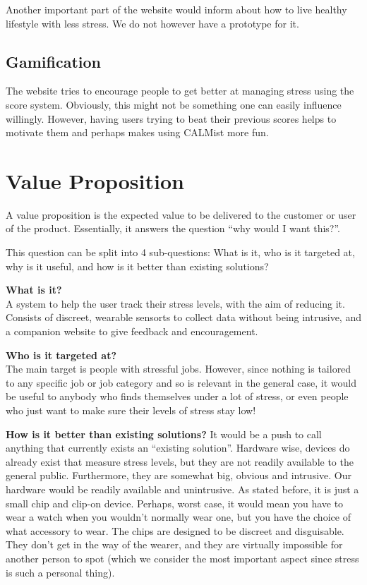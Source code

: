 \documentclass{scrartcl}
\begin{document}
Another important part of the website would inform about how to live healthy lifestyle with less stress. We do not however have a prototype for it.

\subsection{Gamification}

The website tries to encourage people to get better at managing stress using the score system. Obviously, this might not be something one can easily influence willingly. However, having users trying to beat their previous scores helps to motivate them and perhaps makes using CALMist more fun.

\section{Value Proposition}
A value proposition is the expected value to be delivered to the customer or user of the product. Essentially, it answers the
question ``why would I want this?''.

This question can be split into 4 sub-questions: What is it, who is it targeted at, why is it useful, and how is it better than
existing solutions?

\textbf{What is it?}\\
A system to help the user track their stress levels, with the aim of reducing it. Consists of discreet, wearable sensorts to collect
data without being intrusive, and a companion website to give feedback and encouragement.

\textbf{Who is it targeted at?}\\
The main target is people with stressful jobs. However, since nothing is tailored to any specific job or job category and so
is relevant in the general case, it would be useful to anybody who finds themselves under a lot of stress, or even people
who just want to make sure their levels of stress stay low!

\textbf{How is it better than existing solutions?}
It would be a push to call anything that currently exists an ``existing solution''. Hardware wise, devices do already exist that
measure stress levels, but they are not readily available to the general public. Furthermore, they are somewhat big, obvious and
intrusive. Our hardware would be readily available and unintrusive. As stated before, it is just a small chip and clip-on device.
Perhaps, worst case, it would mean you have to wear a watch when you wouldn't normally wear one, but you have the choice of what
accessory to wear. The chips are designed to be discreet and disguisable. They don't get in the way of the wearer, and they are
virtually impossible for another person to spot (which we consider the most important aspect since stress is such a personal
thing).
\end{document}
